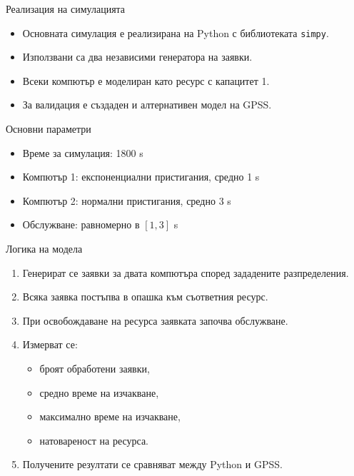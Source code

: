 \documentclass[aspectratio=169]{beamer}
\begin{document}
\begin{frame}{Реализация на симулацията}
    \begin{itemize}
        \item Основната симулация е реализирана на Python с библиотеката \texttt{simpy}.
        \item Използвани са два независими генератора на заявки.
        \item Всеки компютър е моделиран като ресурс с капацитет 1.
        \item За валидация е създаден и алтернативен модел на GPSS.
    \end{itemize}

    \vspace{0.4cm}

    \begin{block}{Основни параметри}
        \begin{itemize}
            \item Време за симулация: 1800 s
            \item Компютър 1: експоненциални пристигания, средно 1 s
            \item Компютър 2: нормални пристигания, средно 3 s
            \item Обслужване: равномерно в $[1,3]$ s
        \end{itemize}
    \end{block}
\end{frame}

\begin{frame}{Логика на модела}
    \begin{enumerate}
        \item Генерират се заявки за двата компютъра според зададените разпределения.
        \item Всяка заявка постъпва в опашка към съответния ресурс.
        \item При освобождаване на ресурса заявката започва обслужване.
        \item Измерват се:
        \begin{itemize}
            \item броят обработени заявки,
            \item средно време на изчакване,
            \item максимално време на изчакване,
            \item натовареност на ресурса.
        \end{itemize}
        \item Получените резултати се сравняват между Python и GPSS.
    \end{enumerate}
\end{frame}
\end{document}
